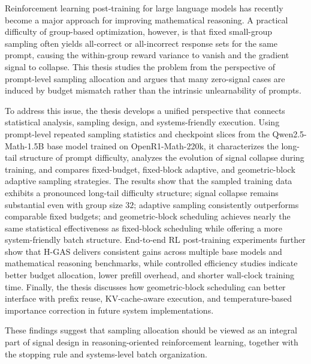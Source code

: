Reinforcement learning post-training for large language models has recently become a major approach for improving mathematical reasoning. A practical difficulty of group-based optimization, however, is that fixed small-group sampling often yields all-correct or all-incorrect response sets for the same prompt, causing the within-group reward variance to vanish and the gradient signal to collapse. This thesis studies the problem from the perspective of prompt-level sampling allocation and argues that many zero-signal cases are induced by budget mismatch rather than the intrinsic unlearnability of prompts.

To address this issue, the thesis develops a unified perspective that connects statistical analysis, sampling design, and systems-friendly execution. Using prompt-level repeated sampling statistics and checkpoint slices from the Qwen2.5-Math-1.5B base model trained on OpenR1-Math-220k, it characterizes the long-tail structure of prompt difficulty, analyzes the evolution of signal collapse during training, and compares fixed-budget, fixed-block adaptive, and geometric-block adaptive sampling strategies. The results show that the sampled training data exhibits a pronounced long-tail difficulty structure; signal collapse remains substantial even with group size $32$; adaptive sampling consistently outperforms comparable fixed budgets; and geometric-block scheduling achieves nearly the same statistical effectiveness as fixed-block scheduling while offering a more system-friendly batch structure. End-to-end RL post-training experiments further show that H-GAS delivers consistent gains across multiple base models and mathematical reasoning benchmarks, while controlled efficiency studies indicate better budget allocation, lower prefill overhead, and shorter wall-clock training time. Finally, the thesis discusses how geometric-block scheduling can better interface with prefix reuse, KV-cache-aware execution, and temperature-based importance correction in future system implementations.

These findings suggest that sampling allocation should be viewed as an integral part of signal design in reasoning-oriented reinforcement learning, together with the stopping rule and systems-level batch organization.

